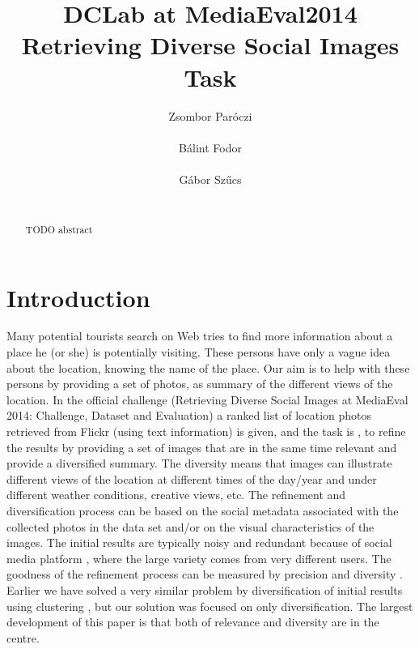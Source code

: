 \documentclass{acm_proc_article-me}
\begin{document}

\title{DCLab at MediaEval2014 Retrieving Diverse Social Images Task}


\author{
\alignauthor
Zsombor Par\'oczi\\
       \\
\alignauthor
B\'alint Fodor\\
       \\
\alignauthor
G\'abor Sz\H ucs \\
       \\
}

\maketitle
\begin{abstract}
TODO abstract
\end{abstract}

\section{Introduction}
Many potential tourists search on Web tries to find more information about a place he (or she) is potentially visiting. These persons have only a vague idea about the location, knowing the name of the place. Our aim is to help with these persons by providing a set of photos, as summary of the different views of the location. 
In the official challenge (Retrieving Diverse Social Images at MediaEval 2014: Challenge, Dataset and Evaluation) \cite{ionescu2014retrieving} a ranked list of location photos retrieved from Flickr (using text information) is given, and the task is , to refine the results by providing a set of images that are in the same time relevant and provide a diversified summary. The diversity means that images can illustrate different views of the location at different times of the day/year and under different weather conditions, creative views, etc. The refinement and diversification process can be based on the social metadata associated with the collected photos in the data set \cite{ionescu2014div400} and/or on the visual characteristics of the images. The initial results are typically noisy and redundant because of social media platform \cite{radu2014hybrid}, where the large variety comes from very different users. 
The goodness of the refinement process can be measured by precision and diversity \cite{Taneva:2010:GRP:1718487.1718541}. Earlier we have solved a very similar problem by diversification of initial results using clustering \cite{szHucs2013bmemtm}, but our solution was focused on only diversification. The largest development of this paper is that both of relevance and diversity are in the centre.
\end{document}
